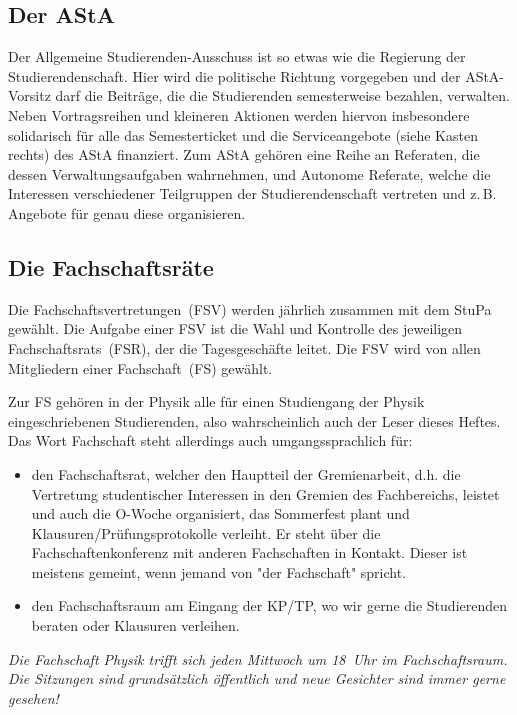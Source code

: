\begin{multicols*}{2}
\subsection{Der AStA}
Der Allgemeine Studierenden-Ausschuss ist so etwas wie die Regierung der Studierendenschaft.
Hier wird die politische Richtung vorgegeben und der AStA-Vorsitz darf die Beiträge, die die Studierenden semesterweise bezahlen, verwalten.
Neben Vortragsreihen und kleineren Aktionen werden hiervon insbesondere solidarisch für alle das Semesterticket und die Serviceangebote (siehe Kasten rechts) des AStA finanziert. Zum AStA gehören eine Reihe an Referaten, die dessen Verwaltungsaufgaben wahrnehmen, und Autonome Referate, welche die Interessen verschiedener Teilgruppen der Studierendenschaft vertreten und z.\,B. Angebote für genau diese organisieren.

\subsection{Die Fachschaftsräte}
Die Fachschaftsvertretungen~(FSV) werden jährlich zusammen mit dem StuPa gewählt.
Die Aufgabe einer FSV ist die Wahl und Kontrolle des jeweiligen Fachschaftsrats~(FSR), der die Tagesgeschäfte leitet.
Die FSV wird von allen Mitgliedern einer Fachschaft~(FS) gewählt.

Zur FS gehören in der Physik alle für einen Studiengang der Physik eingeschriebenen Studierenden, also wahrscheinlich auch der Leser dieses Heftes.
Das Wort Fachschaft steht allerdings auch umgangssprachlich für:
\begin{itemize}
	\item den Fachschaftsrat, welcher den Hauptteil der Gremienarbeit, d.h. die Vertretung studentischer Interessen in den Gremien des Fachbereichs, leistet und auch die O-Woche organisiert, das Sommerfest plant und Klausuren/Prüfungsprotokolle verleiht. Er steht über die Fachschaftenkonferenz mit anderen Fachschaften in Kontakt.
Dieser ist meistens gemeint, wenn jemand von "der Fachschaft" spricht.
	\item den Fachschaftsraum am Eingang der KP/TP, wo wir gerne die Studierenden beraten oder Klausuren verleihen.
\end{itemize}
\emph{Die Fachschaft Physik trifft sich jeden Mittwoch um 18~Uhr im Fachschaftsraum.
Die Sitzungen sind grundsätzlich öffentlich und neue Gesichter sind immer gerne gesehen!}


\end{multicols*}

